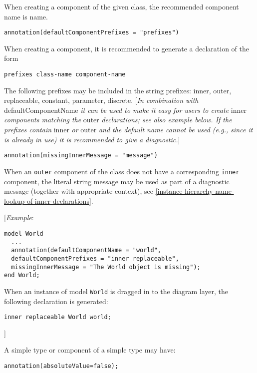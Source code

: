 When creating a component of the given class, the recommended component
name is name.
\begin{lstlisting}[language=modelica]
  annotation(defaultComponentPrefixes = "prefixes")
\end{lstlisting}

When creating a component, it is recommended to generate a declaration
of the form
\begin{lstlisting}[language=modelica]
  prefixes class-name component-name
\end{lstlisting}

The following prefixes may be included in the string prefixes: inner,
outer, replaceable, constant, parameter, discrete. {[}\emph{In
combination with} defaultComponentName \emph{it can be used to make it
easy for users to create} inner \emph{components matching the} outer
\emph{declarations; see also example below. If the prefixes contain} inner \emph{or} outer
\emph{and the default name cannot be used (e.g., since it is already in use) it is recommended to give a diagnostic.}{]}
\begin{lstlisting}[language=modelica]
  annotation(missingInnerMessage = "message")
\end{lstlisting}

When an \lstinline!outer! component of the class does not have a corresponding \lstinline!inner!
component, the literal string message may be used as part of a diagnostic message (together with appropriate context), see
\autoref{instance-hierarchy-name-lookup-of-inner-declarations}.

{[}\emph{Example}:

\begin{lstlisting}[language=modelica]
model World
  ...
  annotation(defaultComponentName = "world",
  defaultComponentPrefixes = "inner replaceable",
  missingInnerMessage = "The World object is missing");
end World;
\end{lstlisting}
When an instance of model \lstinline!World! is dragged in to the diagram layer, the
following declaration is generated:
\begin{lstlisting}[language=modelica]
  inner replaceable World world;
\end{lstlisting}

{]}

A simple type or component of a simple type may have:
\begin{lstlisting}[language=modelica]
  annotation(absoluteValue=false);
\end{lstlisting}

